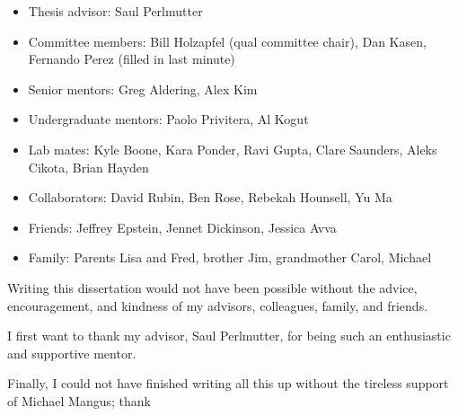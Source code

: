 \begin{itemize}
    \item Thesis advisor: Saul Perlmutter
    \item Committee members: Bill Holzapfel (qual committee chair), Dan Kasen, Fernando Perez (filled in last minute)
    \item Senior mentors: Greg Aldering, Alex Kim
    \item Undergraduate mentors: Paolo Privitera, Al Kogut
    \item Lab mates: Kyle Boone, Kara Ponder, Ravi Gupta, Clare Saunders, Aleks Cikota, Brian Hayden
    \item Collaborators: David Rubin, Ben Rose, Rebekah Hounsell, Yu Ma
    \item Friends: Jeffrey Epstein, Jennet Dickinson, Jessica Avva
    \item Family: Parents Lisa and Fred, brother Jim, grandmother Carol, Michael
\end{itemize}

Writing this dissertation would not have been possible without the advice, encouragement, and kindness of my advisors, colleagues, family, and friends.

I first want to thank my advisor, Saul Perlmutter, for being such an enthusiastic and supportive mentor. 

Finally, I could not have finished writing all this up without the tireless support of Michael Mangus; thank 